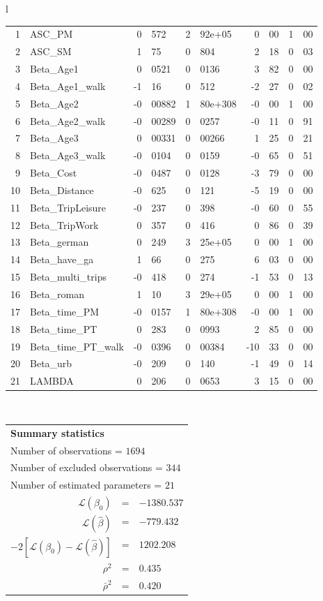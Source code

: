 \begin{tabular}{l}
\begin{tabular}{rlr@{.}lr@{.}lr@{.}lr@{.}l}
1 & ASC_PM  & 0&572 & 2&92e+05 & 0&00 & 1&00\\
2 & ASC_SM & 1&75 & 0&804 & 2&18 & 0&03\\
3 & Beta_Age1 & 0&0521 & 0&0136 & 3&82 & 0&00\\
4 & Beta_Age1_walk & -1&16 & 0&512 & -2&27 & 0&02\\
5 & Beta_Age2 & -0&00882 & 1&80e+308 & -0&00 & 1&00\\
6 & Beta_Age2_walk & -0&00289 & 0&0257 & -0&11 & 0&91\\
7 & Beta_Age3 & 0&00331 & 0&00266 & 1&25 & 0&21\\
8 & Beta_Age3_walk & -0&0104 & 0&0159 & -0&65 & 0&51\\
9 & Beta_Cost & -0&0487 & 0&0128 & -3&79 & 0&00\\
10 & Beta_Distance & -0&625 & 0&121 & -5&19 & 0&00\\
11 & Beta_TripLeisure & -0&237 & 0&398 & -0&60 & 0&55\\
12 & Beta_TripWork & 0&357 & 0&416 & 0&86 & 0&39\\
13 & Beta_german & 0&249 & 3&25e+05 & 0&00 & 1&00\\
14 & Beta_have_ga & 1&66 & 0&275 & 6&03 & 0&00\\
15 & Beta_multi_trips & -0&418 & 0&274 & -1&53 & 0&13\\
16 & Beta_roman & 1&10 & 3&29e+05 & 0&00 & 1&00\\
17 & Beta_time_PM & -0&0157 & 1&80e+308 & -0&00 & 1&00\\
18 & Beta_time_PT & 0&283 & 0&0993 & 2&85 & 0&00\\
19 & Beta_time_PT_walk & -0&0396 & 0&00384 & -10&33 & 0&00\\
20 & Beta_urb & -0&209 & 0&140 & -1&49 & 0&14\\
21 & LAMBDA & 0&206 & 0&0653 & 3&15 & 0&00\\
\hline
\end{tabular}
\\
\begin{tabular}{rcl}
\multicolumn{3}{l}{\bf Summary statistics}\\
\multicolumn{3}{l}{ Number of observations = $1694$} \\
\multicolumn{3}{l}{ Number of excluded observations = $344$} \\
\multicolumn{3}{l}{ Number of estimated  parameters = $21$} \\
 $\mathcal{L}(\beta_0)$ &=&  $-1380.537$ \\
 $\mathcal{L}(\hat{\beta})$ &=& $-779.432 $  \\
 $-2[\mathcal{L}(\beta_0) -\mathcal{L}(\hat{\beta})]$ &=& $1202.208$ \\
    $\rho^2$ &=&   $0.435$ \\
    $\bar{\rho}^2$ &=&    $0.420$ \\
\end{tabular}
  \end{tabular}
